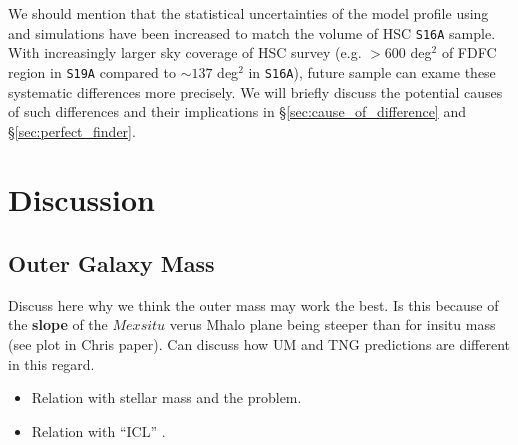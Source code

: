 \documentclass[a4paper,fleqn,usenatbib]{mnras}
\begin{document}
    We should mention that the statistical uncertainties of the model \dsigma{} profile
    using  and \smdpl{} simulations have been increased to match the volume of
    HSC \texttt{S16A} sample.
    With increasingly larger sky coverage of HSC survey (e.g. $>600$ deg$^2$ of FDFC region
    in \texttt{S19A} compared to $\sim 137$ deg$^2$ in \texttt{S16A}), future sample can
    exame these systematic differences more precisely.
    We will briefly discuss the potential causes of such differences and their implications
    in \S \ref{sec:cause_of_difference} and \S \ref{sec:perfect_finder}.

\section{Discussion}
    \label{sec:discussion}


\subsection{Outer Galaxy Mass}
    \label{sec:outer_mstar}

    Discuss here why we think the outer mass may work the best. Is this because of the
    \textbf{slope} of the $Mexsitu$ verus Mhalo plane being steeper than for insitu mass (see
    plot in Chris paper). Can discuss how UM and TNG predictions are different in this regard.



    \begin{itemize}

        \item Relation with \exsitu{} stellar mass and the problem.

        \item Relation with ``ICL'' \mstar{}.

    \end{itemize}
\end{document}
